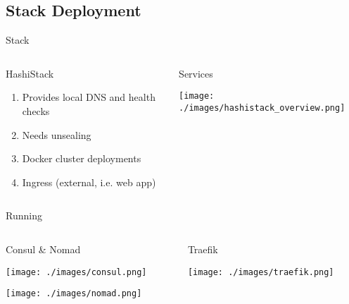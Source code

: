 \documentclass[presentation]{beamer}
\begin{document}
\subsection{Stack Deployment}
\label{sec:org6697a0d}
\begin{frame}[label={sec:org2e7e8eb}]{Stack}
\begin{columns}
\begin{column}{0.5\columnwidth}
\begin{block}{HashiStack}
\begin{enumerate}
\item Provides local DNS and health checks
\item Needs unsealing
\item Docker cluster deployments
\item Ingress (external, i.e. web app)
\end{enumerate}
\end{block}
\end{column}

\begin{column}{0.5\columnwidth}
\begin{block}{Services}
\begin{center}
\texttt{[image: ./images/hashistack\_overview.png]}
\end{center}
\end{block}
\end{column}
\end{columns}
\end{frame}

\begin{frame}[label={sec:orgdb5d0a1}]{Running}
\begin{columns}
\begin{column}{0.4\columnwidth}
\begin{block}{Consul \& Nomad}
\begin{center}
\texttt{[image: ./images/consul.png]}
\end{center}
\begin{center}
\texttt{[image: ./images/nomad.png]}
\end{center}
\end{block}
\end{column}

\begin{column}{0.6\columnwidth}
\begin{block}{Traefik}
\begin{center}
\texttt{[image: ./images/traefik.png]}
\end{center}
\end{block}
\end{column}
\end{columns}
\end{frame}
\end{document}
